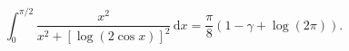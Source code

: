 %

\begin{problem}[pytanie 178790]
    \label{stack_178790}%
    \begin{equation}
        \int_0^{\pi/2} \frac{x^2}{x^2 + [\log (2 \cos x)]^2} \,\mathrm{d}x = \frac{\pi}{8} (1 - \gamma + \log (2 \pi)).
    \end{equation}
\end{problem}

%